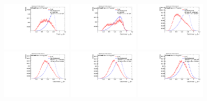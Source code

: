 \begin{figure}
\includegraphics[width=0.3\textwidth]{sascha_input/Appendix/Distributions/top/distributions/beta1/h_normal_tj_nSub32_bin6.pdf} 
\bigskip
\includegraphics[width=0.3\textwidth]{sascha_input/Appendix/Distributions/top/distributions/beta1/h_recoJet_nSub32_bin1.pdf} \hspace{1mm}
\includegraphics[width=0.3\textwidth]{sascha_input/Appendix/Distributions/top/distributions/beta1/h_recoJet_nSub32_bin2.pdf} \hspace{1mm}
\includegraphics[width=0.3\textwidth]{sascha_input/Appendix/Distributions/top/distributions/beta1/h_recoJet_nSub32_bin3.pdf} 
\bigskip
\includegraphics[width=0.3\textwidth]{sascha_input/Appendix/Distributions/top/distributions/beta1/h_recoJet_nSub32_bin4.pdf} \hspace{6mm}
\includegraphics[width=0.3\textwidth]{sascha_input/Appendix/Distributions/top/distributions/beta1/h_recoJet_nSub32_bin5.pdf} \hspace{6mm}

\end{figure}
